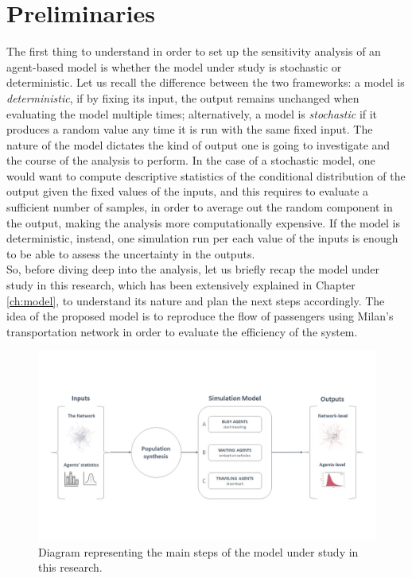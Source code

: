 \section{Preliminaries} \label{sec:ch4_pre}
The first thing to understand in order to set up the sensitivity analysis of an agent-based model is whether the model under study is stochastic or deterministic. Let us recall the difference between the two frameworks: a model is \textit{deterministic}, if by fixing its input, the output remains unchanged when evaluating the model multiple times; alternatively, a model is \textit{stochastic} if it produces a random value any time it is run with the same fixed input. The nature of the model dictates the kind of output one is going to investigate and the course of the analysis to perform. In the case of a stochastic model, one would want to compute descriptive statistics of the conditional distribution of the output given the fixed values of the inputs, and this requires to evaluate a sufficient number of samples, in order to average out the random component in the output, making the analysis more computationally expensive. If the model is deterministic, instead, one simulation run per each value of the inputs is enough to be able to assess the uncertainty in the outputs. \\ So, before diving deep into the analysis, let us briefly recap the model under study in this research, which has been extensively explained in Chapter \ref{ch:model}, to understand its nature and plan the next steps accordingly. The idea of the proposed model is to reproduce the flow of passengers using Milan's transportation network in order to evaluate the efficiency of the system.
\begin{figure}
    \centering
    \includegraphics[width = \textwidth]{tex/pics/model_ppt.jpg}
    \caption{Diagram representing the main steps of the model under study in this research.}
    \label{fig:model_schema}
\end{figure}
